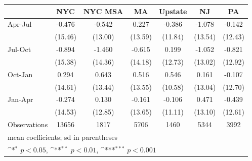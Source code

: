 {
\def\sym#1{\ifmmode^{#1}\else\(^{#1}\)\fi}
\begin{tabular}{l*{6}{c}}
\hline\hline
                    &\multicolumn{1}{c}{NYC}&\multicolumn{1}{c}{NYC MSA}&\multicolumn{1}{c}{MA}&\multicolumn{1}{c}{Upstate}&\multicolumn{1}{c}{NJ}&\multicolumn{1}{c}{PA}\\
\hline
Apr-Jul             &      -0.476         &      -0.542         &       0.227         &      -0.386         &      -1.078         &      -0.142         \\
                    &     (15.46)         &     (13.00)         &     (13.59)         &     (11.84)         &     (13.54)         &     (12.43)         \\
[1em]
Jul-Oct             &      -0.894         &      -1.460         &      -0.615         &       0.199         &      -1.052         &      -0.821         \\
                    &     (15.38)         &     (14.36)         &     (14.18)         &     (12.73)         &     (13.02)         &     (12.92)         \\
[1em]
Oct-Jan             &       0.294         &       0.643         &       0.516         &       0.546         &       0.161         &      -0.107         \\
                    &     (14.61)         &     (13.44)         &     (13.55)         &     (10.58)         &     (13.04)         &     (12.70)         \\
[1em]
Jan-Apr             &      -0.274         &       0.130         &      -0.161         &      -0.106         &       0.471         &      -0.439         \\
                    &     (14.53)         &     (12.85)         &     (13.65)         &     (11.11)         &     (13.10)         &     (12.61)         \\
\hline
Observations        &       13656         &        1817         &        5706         &        1460         &        5344         &        3992         \\
\hline\hline
\multicolumn{7}{l}{\footnotesize mean coefficients; sd in parentheses}\\
\multicolumn{7}{l}{\footnotesize \sym{*} \(p<0.05\), \sym{**} \(p<0.01\), \sym{***} \(p<0.001\)}\\
\end{tabular}
}
